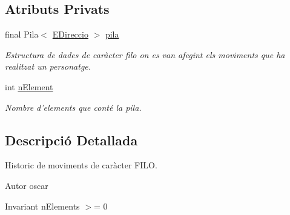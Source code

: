 \subsection*{Atributs Privats}
\begin{DoxyCompactItemize}
\item 
\hypertarget{classlogica_1_1historic__moviments_1_1_historic_moviments_a1c12c94d61ee9f5fd8965048412c6595}{final Pila$<$ \hyperlink{enumlogica_1_1enumeracions_1_1_e_direccio}{E\+Direccio} $>$ \hyperlink{classlogica_1_1historic__moviments_1_1_historic_moviments_a1c12c94d61ee9f5fd8965048412c6595}{pila}}\label{classlogica_1_1historic__moviments_1_1_historic_moviments_a1c12c94d61ee9f5fd8965048412c6595}

\begin{DoxyCompactList}\small\item\em Estructura de dades de caràcter filo on es van afegint els moviments que ha realitzat un personatge. \end{DoxyCompactList}\item 
\hypertarget{classlogica_1_1historic__moviments_1_1_historic_moviments_af68217808f9cd72e0f40bb11bdda5f03}{int \hyperlink{classlogica_1_1historic__moviments_1_1_historic_moviments_af68217808f9cd72e0f40bb11bdda5f03}{n\+Element}}\label{classlogica_1_1historic__moviments_1_1_historic_moviments_af68217808f9cd72e0f40bb11bdda5f03}

\begin{DoxyCompactList}\small\item\em Nombre d'elements que conté la pila. \end{DoxyCompactList}\end{DoxyCompactItemize}


\subsection{Descripció Detallada}
Historic de moviments de caràcter F\+I\+L\+O. 

\begin{DoxyAuthor}{Autor}
oscar 
\end{DoxyAuthor}
\begin{DoxyInvariant}{Invariant}
n\+Elements $>$= 0 
\end{DoxyInvariant}


